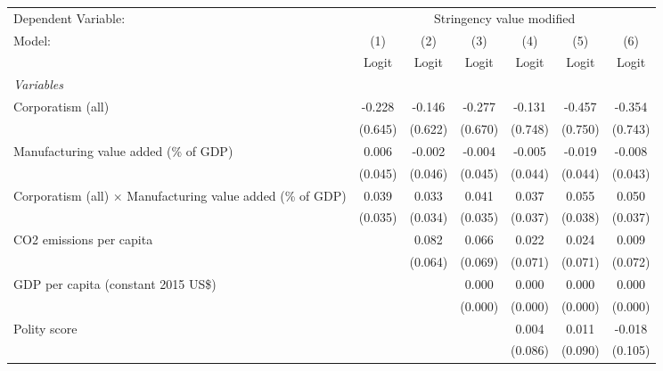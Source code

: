 
\begingroup
\centering
\begin{tabular}{lcccccc}
   \toprule
   Dependent Variable: & \multicolumn{6}{c}{Stringency value modified}\\
   Model:                                                             & (1)     & (2)     & (3)     & (4)     & (5)     & (6)\\  
                                                                      &  Logit  & Logit   & Logit   & Logit   & Logit   & Logit\\  
   \midrule
   \emph{Variables}\\
   Corporatism (all)                                                  & -0.228  & -0.146  & -0.277  & -0.131  & -0.457  & -0.354\\   
                                                                      & (0.645) & (0.622) & (0.670) & (0.748) & (0.750) & (0.743)\\   
   Manufacturing value added (\% of GDP)                              & 0.006   & -0.002  & -0.004  & -0.005  & -0.019  & -0.008\\   
                                                                      & (0.045) & (0.046) & (0.045) & (0.044) & (0.044) & (0.043)\\   
   Corporatism (all) $\times$ Manufacturing value added (\% of GDP)   & 0.039   & 0.033   & 0.041   & 0.037   & 0.055   & 0.050\\   
                                                                      & (0.035) & (0.034) & (0.035) & (0.037) & (0.038) & (0.037)\\   
   CO2 emissions per capita                                           &         & 0.082   & 0.066   & 0.022   & 0.024   & 0.009\\   
                                                                      &         & (0.064) & (0.069) & (0.071) & (0.071) & (0.072)\\   
   GDP per capita (constant 2015 US\$)                                &         &         & 0.000   & 0.000   & 0.000   & 0.000\\   
                                                                      &         &         & (0.000) & (0.000) & (0.000) & (0.000)\\   
   Polity score                                                       &         &         &         & 0.004   & 0.011   & -0.018\\   
                                                                      &         &         &         & (0.086) & (0.090) & (0.105)\\   

\end{tabular}
